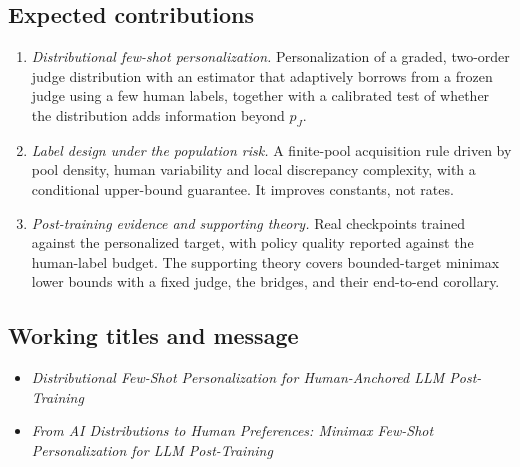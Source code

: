 \subsection{Expected contributions}

\begin{enumerate}[label=\textbf{C\arabic*.}]
  \item \emph{Distributional few-shot personalization.} Personalization of a graded,
        two-order judge distribution with an estimator that adaptively borrows from a frozen judge
        using a few human labels, together with a calibrated test of whether the distribution adds
        information beyond $p_J$.
  \item \emph{Label design under the population risk.} A finite-pool acquisition rule driven by pool
        density, human variability and local discrepancy complexity, with a conditional
        upper-bound guarantee. It improves constants, not rates.
  \item \emph{Post-training evidence and supporting theory.} Real checkpoints trained against the
        personalized target, with policy quality reported against the human-label budget. The
        supporting theory covers bounded-target minimax lower bounds with a fixed judge, the bridges,
        and their end-to-end corollary.
\end{enumerate}

\subsection{Working titles and message}

\begin{itemize}
  \item \emph{Distributional Few-Shot Personalization for Human-Anchored LLM Post-Training}
  \item \emph{From AI Distributions to Human Preferences: Minimax Few-Shot Personalization for LLM
        Post-Training}
\end{itemize}

